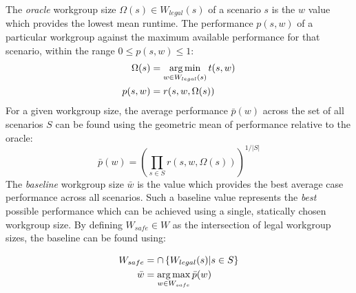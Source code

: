 \documentclass[nonatbib,preprint,9pt]{sigplanconf}
\begin{document}



The \emph{oracle} workgroup size $\Omega(s) \in W_{legal}(s)$ of a
scenario $s$ is the $w$ value which provides the lowest mean
runtime. The performance $p(s,w)$ of a particular workgroup against
the maximum available performance for that scenario, within the range
$0 \le p(s,w) \le 1$:
%
\begin{align}
  \Omega(s) &= \operatorname*{arg\,min}_{w \in W_{legal}(s)} t(s,w)\\
  p(s,w) &= r(s, w, \Omega(s))
\end{align}
%
For a given workgroup size, the average performance $\bar{p}(w)$
across the set of all scenarios $S$ can be found using the geometric
mean of performance relative to the oracle:
%
\begin{equation}
\bar{p}(w) =
\left(
  \prod_{s \in S} r(s, w, \Omega(s))
\right)^{1/|S|}
\end{equation}
%
The \emph{baseline} workgroup size $\bar{w}$ is the value which
provides the best average case performance across all scenarios. Such
a baseline value represents the \emph{best} possible performance which
can be achieved using a single, statically chosen workgroup size. By
defining $W_{safe} \in W$ as the intersection of legal workgroup
sizes, the baseline can be found using:

\begin{align}
W_{safe} &= \cap \left\{ W_{legal}(s) | s \in S \right\}\\
\bar{w} &= \operatorname*{arg\,max}_{w \in W_{safe}} \bar{p}(w)
\end{align}
\end{document}
